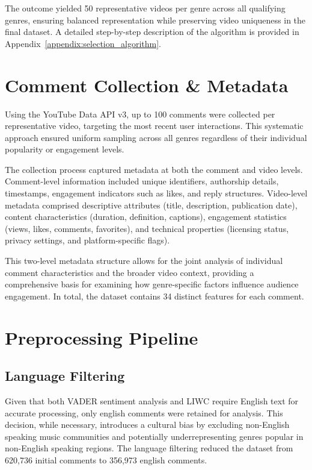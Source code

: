 The outcome yielded 50 representative videos per genre across all qualifying genres, ensuring balanced representation while preserving video uniqueness in the final dataset. A detailed step-by-step description of the algorithm is provided in Appendix~\ref{appendix:selection_algorithm}.


\section{Comment Collection \& Metadata}

Using the YouTube Data API v3, up to 100 comments were collected per representative video, targeting the most recent user interactions. This systematic approach ensured uniform sampling across all genres regardless of their individual popularity or engagement levels.

The collection process captured metadata at both the comment and video levels. Comment-level information included unique identifiers, authorship details, timestamps, engagement indicators such as likes, and reply structures. Video-level metadata comprised descriptive attributes (title, description, publication date), content characteristics (duration, definition, captions), engagement statistics (views, likes, comments, favorites), and technical properties (licensing status, privacy settings, and platform-specific flags).

This two-level metadata structure allows for the joint analysis of individual comment characteristics and the broader video context, providing a comprehensive basis for examining how genre-specific factors influence audience engagement. In total, the dataset contains 34 distinct features for each comment.

\section{Preprocessing Pipeline}

\subsection{Language Filtering}
Given that both VADER sentiment analysis and LIWC require English text for accurate processing, only english comments were retained for analysis. This decision, while necessary, introduces a cultural bias by excluding non-English speaking music communities and potentially underrepresenting genres popular in non-English speaking regions. The language filtering reduced the dataset from 620,736 initial comments to 356,973 english comments.

